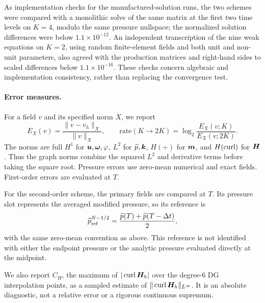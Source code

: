As implementation checks for the manufactured-solution runs,
the two schemes were compared with a
monolithic solve of the same matrix at the first two time levels on
$K=4$, modulo the same pressure
nullspace; the normalized solution differences were below $1.1\times10^{-12}$.
An independent transcription of the nine weak equations on $K=2$,
using random finite-element fields and both unit and non-unit parameters,
also agreed with the production matrices and right-hand sides to
scaled differences below $1.1\times10^{-16}$.
These checks concern algebraic and implementation consistency, rather
than replacing the convergence test.

\paragraph{Error measures.}
For a field $v$ and its specified norm $X$, we report
\[
E_X(v)=\frac{\|v-v_h\|_X}{\|v\|_X},\qquad
\mathrm{rate}(K\to2K)=\log_2\frac{E_X(v;K)}{E_X(v;2K)}.
\]
The norms are full $H^1$ for $\boldsymbol u,\boldsymbol\omega,\varphi$, $L^2$ for
$\widetilde p,\boldsymbol k$, $H(\div)$ for $\boldsymbol m$, and $H(\operatorname{curl})$ for
$\boldsymbol H$. Thus the graph norms combine the squared $L^2$ and derivative
terms before taking the square root. Pressure errors use zero-mean
numerical and exact fields. First-order errors are evaluated at $T$.

For the second-order scheme, the primary fields are compared at $T$.
Its pressure slot represents the averaged modified pressure, so its reference is
\[
\widetilde p_{\mathrm{ref}}^{N-1/2}
=\frac{\widetilde p(T)+\widetilde p(T-\Delta t)}{2},
\]
with the same zero-mean convention as above. This reference is not
identified with either the endpoint pressure or the analytic pressure
evaluated directly at the midpoint.

We also report $C_H$, the maximum of $|\operatorname{curl}\boldsymbol H_h|$ over the
degree-6 DG interpolation points, as a sampled estimate of
$\|\operatorname{curl}\boldsymbol H_h\|_{L^\infty}$. It is an absolute diagnostic, not a
relative error or a rigorous continuous supremum.

